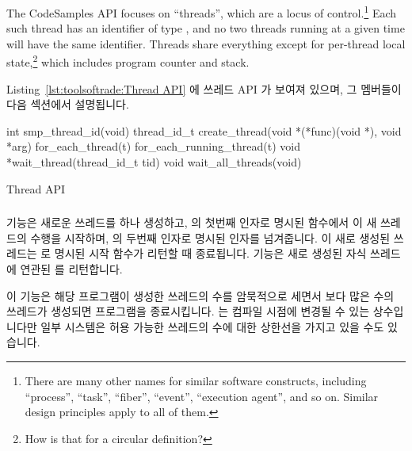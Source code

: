The CodeSamples API focuses on ``threads'', which are a locus of
control.\footnote{
	There are many other names for similar software constructs, including
	``process'', ``task'', ``fiber'', ``event'', ``execution agent'',
	and so on.
	Similar design principles apply to all of them.}
Each such thread has an identifier of type ,
and no two threads running at a given time will have the same
identifier.
Threads share everything except for per-thread local state,\footnote{
	How is that for a circular definition?}
which includes program counter and stack.

\fi

Listing~\ref{lst:toolsoftrade:Thread API} 에 쓰레드 API 가 보여져 있으며, 그
멤버들이 다음 섹션에서 설명됩니다.

\begin{listing}[tbp]
\begin{VerbatimL}[numbers=none,xleftmargin=2pt]
int smp_thread_id(void)
thread_id_t create_thread(void *(*func)(void *), void *arg)
for_each_thread(t)
for_each_running_thread(t)
void *wait_thread(thread_id_t tid)
void wait_all_threads(void)
\end{VerbatimL}
\caption{Thread API}
\label{lst:toolsoftrade:Thread API}
\end{listing}

\subsubsection{}

 기능은 새로운 쓰레드를 하나 생성하고,
 의 첫번째 인자로 명시된  함수에서 이 새
쓰레드의 수행을 시작하며,  의 두번째 인자로 명시된
인자를 넘겨줍니다.
이 새로 생성된 쓰레드는  로 명시된 시작 함수가 리턴할 때 종료됩니다.
 기능은 새로 생성된 자식 쓰레드에 연관된
 를 리턴합니다.

이 기능은 해당 프로그램이 생성한 쓰레드의 수를 암묵적으로 세면서
 보다 많은 수의 쓰레드가 생성되면 프로그램을 종료시킵니다.
 는 컴파일 시점에 변경될 수 있는 상수입니다만 일부 시스템은
허용 가능한 쓰레드의 수에 대한 상한선을 가지고 있을 수도 있습니다.

